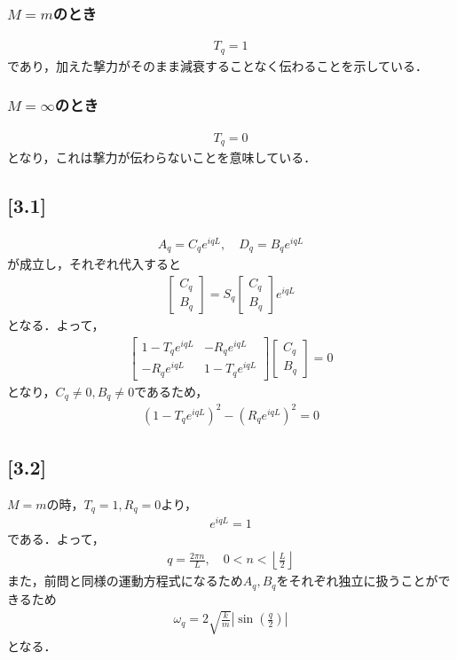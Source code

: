 \documentclass[12pt,dvipdfmx]{jsarticle}
\begin{document}
\subsubsection*{$M=m$のとき}
\begin{eqnarray}
  T_q =1
\end{eqnarray}
であり，加えた撃力がそのまま減衰することなく伝わることを示している．
\subsubsection*{$M=\infty$のとき}
\begin{eqnarray}
  T_q =0
\end{eqnarray}
となり，これは撃力が伝わらないことを意味している．

\subsection*{\large{[3.1]}}
\begin{eqnarray}
  A_q =C_q e^{iqL},\quad D_q = B_q e^{iqL}
\end{eqnarray}
が成立し，それぞれ代入すると
\begin{eqnarray}
  \begin{bmatrix}
    C_q \\
    B_q
  \end{bmatrix}
  = S_q 
  \begin{bmatrix}
    C_q\\
    B_q
  \end{bmatrix}
  e^{iqL}
\end{eqnarray}
となる．よって，
\begin{eqnarray}
  \begin{bmatrix}
    1-T_q e^{iqL} & - R_qe^{iqL}\\
    - R_qe^{iqL} & 1- T_q e^{iqL}
  \end{bmatrix}
  \begin{bmatrix}
    C_q\\
    B_q
  \end{bmatrix} =0
\end{eqnarray}
となり，$C_q\neq 0, B_q \neq 0$であるため，
\begin{eqnarray}
  \left( 1- T_q e^{iqL} \right)^2 -(R_qe^{iqL})^2= 0
\end{eqnarray}
\subsection*{\large{[3.2]}}
$M=m$の時，$T_q=1,R_q=0$より，
\begin{eqnarray}
  e^{iqL}=1
\end{eqnarray}
である．よって，
\begin{eqnarray}
  q = \frac{2\pi n}{L},\quad 0<n< \left\lfloor\frac{L}{2} \right\rfloor 
\end{eqnarray}
また，前問と同様の運動方程式になるため$A_q, B_q$をそれぞれ独立に扱うことができるため
\begin{eqnarray}
  \omega_q = 2\sqrt{\frac{k}{m}}\left| \sin\left(\frac{q}{2}\right) \right|
\end{eqnarray}
となる．
\end{document}
